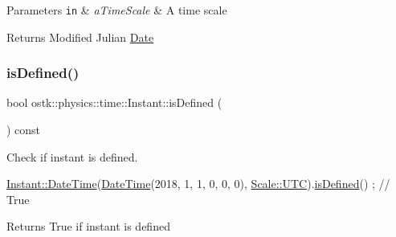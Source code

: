 \begin{DoxyParams}[1]{Parameters}
\mbox{\tt in}  & {\em a\+Time\+Scale} & A time scale \\
\hline
\end{DoxyParams}
\begin{DoxyReturn}{Returns}
Modified Julian \hyperlink{classostk_1_1physics_1_1time_1_1_date}{Date} 
\end{DoxyReturn}
\mbox{\label{classostk_1_1physics_1_1time_1_1_instant_a3036cb77f2686a81c51f0c658881b3ff}} 
\subsubsection{\texorpdfstring{is\+Defined()}{isDefined()}}
{\footnotesize\ttfamily bool ostk\+::physics\+::time\+::\+Instant\+::is\+Defined (\begin{DoxyParamCaption}{ }\end{DoxyParamCaption}) const}



Check if instant is defined. 


\begin{DoxyCode}
\hyperlink{classostk_1_1physics_1_1time_1_1_instant_afd5725574a02389b80fad4baff313c8a}{Instant::DateTime}(\hyperlink{classostk_1_1physics_1_1time_1_1_instant_afd5725574a02389b80fad4baff313c8a}{DateTime}(2018, 1, 1, 0, 0, 0), 
      \hyperlink{namespaceostk_1_1physics_1_1time_adf23d37bd8641fb76a0e98ab46a70df7a9234324ddf6b4176b57d803a925b7961}{Scale::UTC}).\hyperlink{classostk_1_1physics_1_1time_1_1_instant_a3036cb77f2686a81c51f0c658881b3ff}{isDefined}() ; \textcolor{comment}{// True}
\end{DoxyCode}


\begin{DoxyReturn}{Returns}
True if instant is defined 
\end{DoxyReturn}
\mbox{\label{classostk_1_1physics_1_1time_1_1_instant_a6bbb53cd76ec7d4e89ebbb45cf7ae03b}} 
